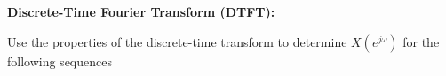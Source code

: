 \documentclass[a4paper, 10pt]{article}
\begin{document}

\newpage

\begin{problem}
    \textbf{Discrete-Time Fourier Transform (DTFT):}
\end{problem}

\begin{subproblems}
    \item Use the properties of the discrete-time transform to determine \( X(e^{j\omega}) \) for the following sequences
\end{subproblems}
\end{document}
